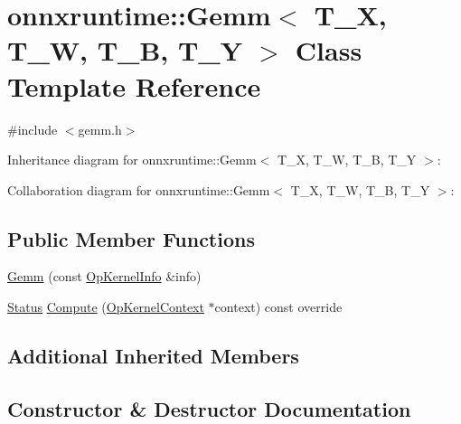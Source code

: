 \hypertarget{classonnxruntime_1_1Gemm}{}\section{onnxruntime\+:\+:Gemm$<$ T\+\_\+X, T\+\_\+W, T\+\_\+B, T\+\_\+Y $>$ Class Template Reference}
\label{classonnxruntime_1_1Gemm}


{\ttfamily \#include $<$gemm.\+h$>$}



Inheritance diagram for onnxruntime\+:\+:Gemm$<$ T\+\_\+X, T\+\_\+W, T\+\_\+B, T\+\_\+Y $>$\+:


Collaboration diagram for onnxruntime\+:\+:Gemm$<$ T\+\_\+X, T\+\_\+W, T\+\_\+B, T\+\_\+Y $>$\+:
\subsection*{Public Member Functions}
\begin{DoxyCompactItemize}
\item 
\mbox{\hyperlink{classonnxruntime_1_1Gemm_a0e6ddc889c104bc5adc669963735b497}{Gemm}} (const \mbox{\hyperlink{classonnxruntime_1_1OpKernelInfo}{Op\+Kernel\+Info}} \&info)
\item 
\mbox{\hyperlink{classonnxruntime_1_1common_1_1Status}{Status}} \mbox{\hyperlink{classonnxruntime_1_1Gemm_a101485edb48c02c16e452181a5134828}{Compute}} (\mbox{\hyperlink{classonnxruntime_1_1OpKernelContext}{Op\+Kernel\+Context}} $\ast$context) const override
\end{DoxyCompactItemize}
\subsection*{Additional Inherited Members}


\subsection{Constructor \& Destructor Documentation}
\mbox{\label{classonnxruntime_1_1Gemm_a0e6ddc889c104bc5adc669963735b497}} 
